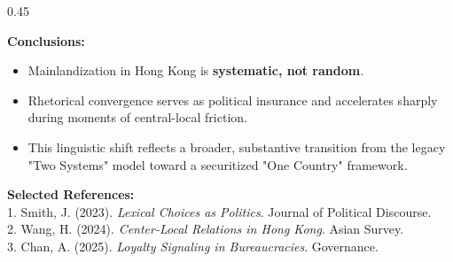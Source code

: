\documentclass[final,table]{beamer} %
\begin{document}
\begin{frame}[t]
\begin{columns}[T]
\begin{column}{0.45\textwidth}
        \vspace{2cm}

        \begin{tcolorbox}[posterbox={6}{Conclusion \& References}]
            \textbf{Conclusions:}
            \vspace{0.8cm}
            \begin{itemize}
                \item Mainlandization in Hong Kong is \textbf{systematic, not random}.
                \item Rhetorical convergence serves as political insurance and accelerates sharply during moments of central-local friction.
                \item This linguistic shift reflects a broader, substantive transition from the legacy "Two Systems" model toward a securitized "One Country" framework.
            \end{itemize}
            
            \vspace{2cm}
            \textbf{Selected References:}
            \vspace{0.5cm}
            \\ \normalsize 
            1. Smith, J. (2023). \textit{Lexical Choices as Politics}. Journal of Political Discourse.\\
            2. Wang, H. (2024). \textit{Center-Local Relations in Hong Kong}. Asian Survey.\\
            3. Chan, A. (2025). \textit{Loyalty Signaling in Bureaucracies}. Governance.
        \end{tcolorbox}

    \end{column}

\end{columns}

\end{frame}
\end{document}
